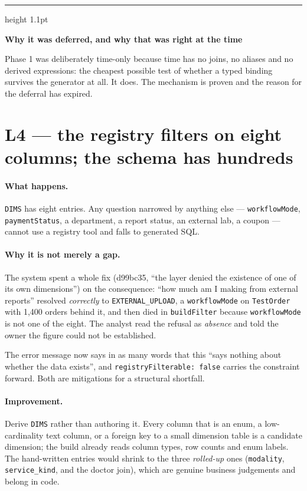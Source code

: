 \documentclass[11pt,a4paper]{report}
\newcommand{\code}[1]{\texttt{\small #1}}
\newcommand{\sha}[1]{{\ttfamily\small\color{slate}#1}}
\newenvironment{keybox}[1]
 {\par\medskip\begin{center}\begin{minipage}{0.94\textwidth}%
  {\color{navy}\hrule height 1.1pt}\vspace{5pt}\par
  \textbf{\color{navy}#1}\par\vspace{3pt}\small}
 {\par\vspace{5pt}{\color{mist}\hrule height 0.8pt}\end{minipage}\end{center}\medskip}
\begin{document}
\begin{keybox}{Why it was deferred, and why that was right at the time}
Phase 1 was deliberately time-only because time has no joins, no aliases and no derived
expressions: the cheapest possible test of whether a typed binding survives the generator at all.
It does. The mechanism is proven and the reason for the deferral has expired.
\end{keybox}

\section{L4 --- the registry filters on eight columns; the schema has hundreds}

\paragraph{What happens.} \code{DIMS} has eight entries. Any question narrowed by anything else ---
\code{workflowMode}, \code{paymentStatus}, a department, a report status, an external lab, a
coupon --- cannot use a registry tool and falls to generated SQL.

\paragraph{Why it is not merely a gap.} The system spent a whole fix (\sha{d99bc35}, ``the layer
denied the existence of one of its own dimensions'') on the consequence: ``how much am I making
from external reports'' resolved \emph{correctly} to \code{EXTERNAL\_UPLOAD}, a \code{workflowMode}
on \code{TestOrder} with 1{,}400 orders behind it, and then died in \code{buildFilter} because
\code{workflowMode} is not one of the eight. The analyst read the refusal as \emph{absence} and told
the owner the figure could not be established.

The error message now says in as many words that this ``says nothing about whether the data
exists'', and \code{registryFilterable: false} carries the constraint forward. Both are mitigations
for a structural shortfall.

\paragraph{Improvement.} Derive \code{DIMS} rather than authoring it. Every column that is an enum,
a low-cardinality text column, or a foreign key to a small dimension table is a candidate
dimension; the build already reads column types, row counts and enum labels. The hand-written
entries would shrink to the three \emph{rolled-up} ones (\code{modality}, \code{service\_kind}, and
the doctor join), which are genuine business judgements and belong in code.
\end{document}
